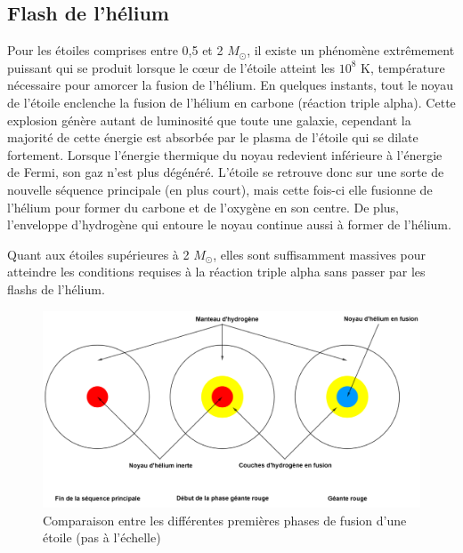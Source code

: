 \subsection{Flash de l'hélium}\label{2.2.1}

Pour les étoiles comprises entre 0,5 et 2 $M_\odot$, il existe un phénomène extrêmement puissant qui se produit lorsque le cœur de l’étoile atteint les $10^{8}$ K, température nécessaire pour amorcer la fusion de l’hélium. En quelques instants, tout le noyau de l’étoile enclenche la fusion de l’hélium en carbone (réaction triple alpha). Cette explosion génère autant de luminosité que toute une galaxie, cependant la majorité de cette énergie est absorbée par le plasma de l’étoile qui se dilate fortement. Lorsque l’énergie thermique du noyau redevient inférieure à l’énergie de Fermi, son gaz n’est plus dégénéré. L’étoile se retrouve donc sur une sorte de nouvelle séquence principale (en plus court), mais cette fois-ci elle fusionne de l’hélium pour former du carbone et de l’oxygène en son centre. De plus, l’enveloppe d’hydrogène qui entoure le noyau continue aussi à former de l’hélium.\smallskip

Quant aux étoiles supérieures à 2 $M_\odot$, elles sont suffisamment massives pour atteindre les conditions requises à la réaction triple alpha sans passer par les flashs de l’hélium.\newpage

\begin{figure}[H]\vspace{1cm}
	\centering
	\includegraphics[scale=0.38]{images/compo_sp_gr}
	\caption[Comparaison entre les différentes premières phases de fusion d'une étoile (pas à l'échelle) - figure réalisée avec GeoGebra]{Comparaison entre les différentes premières phases de fusion d'une étoile (pas à l'échelle)}
	\label{Fig. 2.4}
\end{figure}

